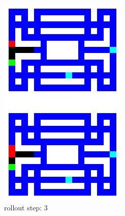 \begin{figure}[H]
\begin{subfigure}[b]{0.16\textwidth}
        \includegraphics[width=\textwidth]{./Images/env_model_rollout_3.png}
  		\caption*{\footnotesize rollout step: 3} 
  		\label{fig:rollout_3}
    \end{subfigure} 
    \hspace{0mm}%
    \begin{subfigure}[b]{0.16\textwidth}

\end{subfigure}
\end{figure}
